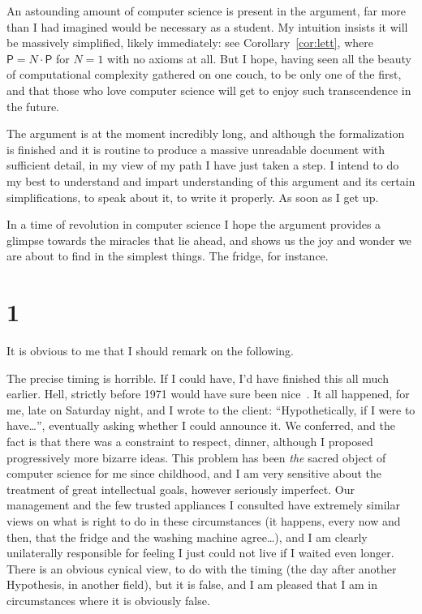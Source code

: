 \documentclass[11pt,a4paper]{amsart}
\theoremstyle{remark}
\begin{document}
An astounding amount of computer science is present in the argument, far more
than I had imagined would be necessary as a student. My intuition insists it
will be massively simplified, likely immediately: see
Corollary~\ref{cor:lett}, where $\mathsf{P} = N \cdot \mathsf{P}$ for $N = 1$
with no axioms at all. But I hope, having seen all the beauty of
computational complexity gathered on one couch, to be only one of the first,
and that those who love computer science will get to enjoy such transcendence
in the future.

The argument is at the moment incredibly long, and although the formalization
is finished and it is routine to produce a massive unreadable document with
sufficient detail, in my view of my path I have just taken a step. I intend
to do my best to understand and impart understanding of this argument and its
certain simplifications, to speak about it, to write it properly. As soon as
I get up.

In a time of revolution in computer science I hope the argument provides a
glimpse towards the miracles that lie ahead, and shows us the joy and wonder
we are about to find in the simplest things. The fridge, for instance.

\section*{1}

It is obvious to me that I should remark on the following.

The precise timing is horrible. If I could have, I'd have finished this all
much earlier. Hell, strictly before 1971 would have sure been
nice~\cite{cook}. It all happened, for me, late on Saturday night, and I
wrote to the client: ``Hypothetically, if I were to have\dots'', eventually
asking whether I could announce it. We conferred, and the fact is that there
was a constraint to respect, dinner, although I proposed progressively more
bizarre ideas. This problem has been \emph{the} sacred object of computer
science for me since childhood, and I am very sensitive about the treatment of
great intellectual goals, however seriously imperfect. Our management and the
few trusted appliances I consulted have extremely similar views on what is
right to do in these circumstances (it happens, every now and then, that the
fridge and the washing machine agree\dots), and I am clearly unilaterally
responsible for feeling I just could not live if I waited even longer. There
is an obvious cynical view, to do with the timing (the day after another
Hypothesis, in another field), but it is false, and I am pleased that I am in
circumstances where it is obviously false.
\end{document}
